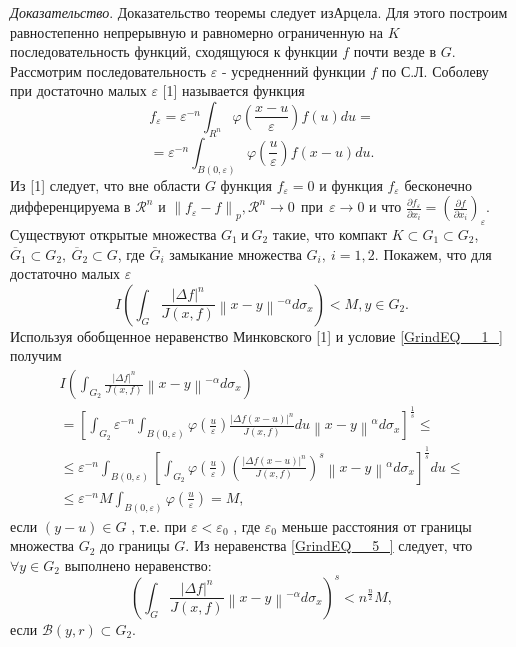 \textit{Доказательство}. Доказательство теоремы следует из Арцела. Для этого построим равностепенно непрерывную и равномерно ограниченную на $K$ последовательность функций,
сходящуюся к функции $f$ почти везде в $G$. Рассмотрим последовательность $\varepsilon$ - усредненний функции $f$ по С.Л. Соболеву при достаточно малых $\varepsilon$ [1] называется функция 
$$f_{\varepsilon } =\varepsilon ^{-n} \int _{R^{n} }\varphi \left(\frac{x-u}{\varepsilon } \right) f\left(u\right)du=$$
$$=\varepsilon ^{-n} \int _{B\left(0,\varepsilon \right)}\varphi \left(\frac{u}{\varepsilon } \right) f\left(x-u\right)du.$$
Из [1] следует, что вне области $G$ функция $f_{\varepsilon }=0$ и функция $f_{\varepsilon }$ бесконечно дифференцируема в
${\mathcal{R}}^n$ и ${\left\|f_{\varepsilon }-f\right\|}_p,{\mathcal{R}}^n\rightarrow0\ \ \mathrm{\textrm{п}\textrm{р}\textrm{и}}\mathrm{\ \ }\varepsilon \rightarrow0$ и что
$\frac{\partial f_{\varepsilon } }{\partial x_{i} } =\left(\frac{\partial f}{\partial x_{i} } \right)_{\varepsilon } $.
Существуют открытые множества $G_1\ \textrm{и}\ G_2$ такие, что компакт $K\subset G_1\subset G_2$, ${\overline{G}}_1\subset G_2,\ {\overline{G}}_2\subset G$,
где $\bar{G}_{i} $ замыкание множества $G_i,\ i=1,2.$ Покажем, что для достаточно малых $\varepsilon$
$$I\left(\int _{G}\frac{\left|\Delta f\right|^{n} }{J\left(x,f\right)} \left\| x-y\right\| ^{-\alpha }  d\sigma _{x} \right)<M,y\in G_{2}.$$
Используя обобщенное неравенство Минковского [1] и условие \ref{GrindEQ__1_} получим 
\begin{equation}\label{GrindEQ__5_} 
    \begin{gathered}
        I\left(\int _{G_{2} }\frac{\left|\Delta f\right|^{n} }{J\left(x,f\right)} \left\| x-y\right\| ^{-\alpha }  d\sigma _{x} \right) \\
        =\left[\int _{G_{2} }\varepsilon ^{-n} \int _{B\left(0,\varepsilon \right)}\varphi \left(\frac{u}{\varepsilon } \right)
        \frac{\left|\Delta f\left(x-u\right)\right|^{n} }{J\left(x,f\right)} du\left\| x-y\right\| ^{\alpha } d\sigma _{x}  \right]^{\frac{1}{s} } \le \\
        \le \varepsilon ^{-n}\!\!\int _{B\left(0,\varepsilon \right)}\left[\int _{G_{2} }\varphi \left(\frac{u}{\varepsilon } \right)
        \left(\frac{\left|\Delta f\left(x-u\right)\right|^{n} }{J\left(x,f\right)} \right)^{s} \left\| x-y\right\| ^{\alpha } d\sigma _{x} \right]^{\frac{1}{s}}\!du\!\le \\
        \le \varepsilon ^{-n} M\int _{B\left(0,\varepsilon \right)}\varphi \left(\frac{u}{\varepsilon } \right) =M,
    \end{gathered}
\end{equation}
если $\left(y-u\right)\in G$ , т.е. при $\varepsilon <{\varepsilon }_0$ , где ${\varepsilon }_0$ меньше расстояния от границы множества $G_2$ до границы $G$.
Из неравенства \ref{GrindEQ__5_} следует, что $\forall y\in G_2$ выполнено неравенство:
$$\left(\int _{G}\frac{\left|\Delta f\right|^{n} }{J\left(x,f\right)} \left\| x-y\right\| ^{-\alpha }  d\sigma _{x} \right)^{s} <n^{\frac{n}{2} } M,$$
если $\mathcal{B}(y,r)\subset G_2$.

